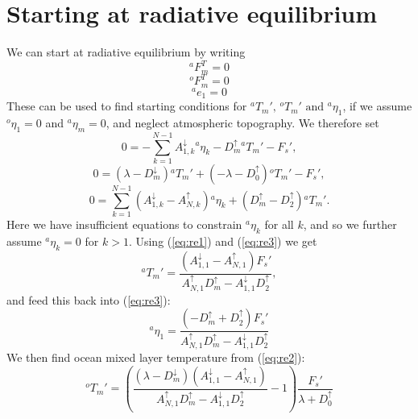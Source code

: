\documentclass[11pt, a4paper,twoside]{article}
\newcommand{\etb}[2]{{{}^{#1}\eta_{#2}}}
\newcommand{\e}[2]{{{}^{#1}e_{#2}}}
\newcommand{\T}[2]{{{}^{#1}T_{#2}}}
\newcommand{\aup}[1]{A^{\uparrow}_{#1}}
\newcommand{\adown}[1]{A^{\downarrow}_{#1}}
\newcommand{\dup}[1]{D^{\uparrow}_{#1}}
\newcommand{\ddown}[1]{D^{\downarrow}_{#1}}
\newcommand{\F}[3]{{{}^{#1}F^{#3}_{#2}}}
\numberwithin{equation}{section}
\begin{document}
\section{Starting at radiative equilibrium}\label{app:equ}

We can start at radiative equilibrium by writing
\begin{equation}\F{a}{m}{T}=0\end{equation}
\begin{equation}\F{o}{m}{T}=0\end{equation}
\begin{equation}\e{a}{1}=0\end{equation}
These can be used to find starting conditions for $\T{a}{m}', \, \T{o}{m}' \text{ and } \etb{a}{1}$, if we assume $\etb{o}{1}=0$ and $\etb{a}{m}=0$, and neglect atmospheric topography.
We therefore set
\begin{equation}\label{eq:re1}
0 =  - \sum_{k=1}^{N-1}\adown{1,k}\etb{a}{k}  -\dup{m} \T{a}{m}'  - F_s',
\end{equation}
\begin{equation}\label{eq:re2}
0 =  ( \lambda -  \ddown{m})\T{a}{m}'+ (-\lambda - \dup{0})\T{o}{m}'  - F_s',
\end{equation}
\begin{equation}\label{eq:re3}
0  =   \sum_{k=1}^{N-1}\left(\adown{1,k} - \aup{N,k}\right)\etb{a}{k}  + (\dup{m} - \dup{2})\T{a}{m}' .
\end{equation}
Here we have insufficient equations to constrain $\etb{a}{k}$ for all $k$, and so we further assume $\etb{a}{k}=0$ for $k > 1$.
Using (\ref{eq:re1}) and (\ref{eq:re3}) we get
\begin{equation}
\T{a}{m}' =  \frac{(\adown{1,1} - \aup{N,1}) F_s'}{\aup{N,1}\dup{m} - \adown{1,1}\dup{2}},
\end{equation}
and feed this back into (\ref{eq:re3}):
\begin{equation}
\etb{a}{1} =  \frac{ (- \dup{m} +\dup{2}) F_s'}{\aup{N,1}\dup{m} - \adown{1,1}\dup{2}}
\end{equation}
We then find ocean mixed layer temperature from (\ref{eq:re2}):
\begin{equation}
\T{o}{m}' = \left( \frac{ ( \lambda -  \ddown{m})(\adown{1,1} - \aup{N,1})}{\aup{N,1}\dup{m} - \adown{1,1}\dup{2}} - 1 \right) \frac{F_s'}{\lambda + \dup{0}}
\end{equation}
\end{document}

